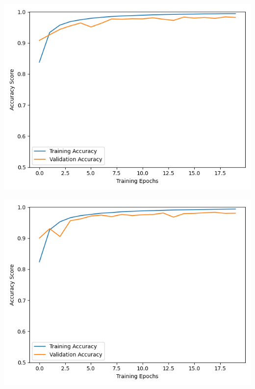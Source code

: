 \documentclass[11pt, letterpaper]{article}
\newenvironment{Figure}
  {\par\medskip\noindent\minipage{\linewidth}}
  {\endminipage\par\medskip}
\begin{document}
\begin{multicols}{2}
  \begin{Figure}
    \centering
    \includegraphics[width=1.0\textwidth]{figures/learning-curve-vgg10-dlib-hflip-combined-125-0001.png}
    \label{learning-curve-vgg10-combined}
  \end{Figure}

  \begin{Figure}
    \centering
    \includegraphics[width=1.0\textwidth]{figures/learning-curve-vgg10-dlib-hflip-rgb-combined-125-0001.png}
    \label{learning-curve-vgg10-rgb-combined}
  \end{Figure}


\end{multicols}
\end{document}
